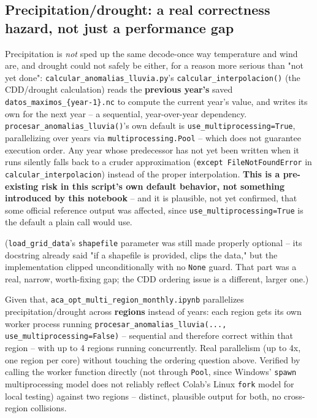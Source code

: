 \documentclass[11pt]{article}
\begin{document}
\subsection{Precipitation/drought: a real correctness hazard, not just a
performance gap}
\label{sec:cdd-race}

Precipitation is \emph{not} sped up the same decode-once way temperature
and wind are, and drought could not safely be either, for a reason more
serious than "not yet done":
\texttt{calcular\_anomalias\_lluvia.py}'s \texttt{calcular\_interpolacion()}
(the CDD/drought calculation) reads the \textbf{previous year's} saved
\texttt{datos\_maximos\_\{year-1\}.nc} to compute the current year's value,
and writes its own for the next year -- a sequential, year-over-year
dependency. \texttt{procesar\_anomalias\_lluvia()}'s own default is
\texttt{use\_multiprocessing=True}, parallelizing over years via
\texttt{multiprocessing.Pool} -- which does not guarantee execution order.
Any year whose predecessor has not yet been written when it runs silently
falls back to a cruder approximation (\texttt{except FileNotFoundError}
in \texttt{calcular\_interpolacion}) instead of the proper interpolation.
\textbf{This is a pre-existing risk in this script's own default
behavior, not something introduced by this notebook} -- and it is
plausible, not yet confirmed, that some official reference output was
affected, since \texttt{use\_multiprocessing=True} is the default a plain
call would use.

(\texttt{load\_grid\_data}'s \texttt{shapefile} parameter was still made
properly optional -- its docstring already said "if a shapefile is
provided, clips the data," but the implementation clipped unconditionally
with no \texttt{None} guard. That part was a real, narrow, worth-fixing
gap; the CDD ordering issue is a different, larger one.)

Given that, \texttt{aca\_opt\_multi\_region\_monthly.ipynb} parallelizes
precipitation/drought across \textbf{regions} instead of years: each
region gets its own worker process running
\texttt{procesar\_anomalias\_lluvia(..., use\_multiprocessing=False)} --
sequential and therefore correct within that region -- with up to 4
regions running concurrently. Real parallelism (up to 4x, one region per
core) without touching the ordering question above. Verified by calling
the worker function directly (not through \texttt{Pool}, since Windows'
\texttt{spawn} multiprocessing model does not reliably reflect Colab's
Linux \texttt{fork} model for local testing) against two regions --
distinct, plausible output for both, no cross-region collisions.
\end{document}
